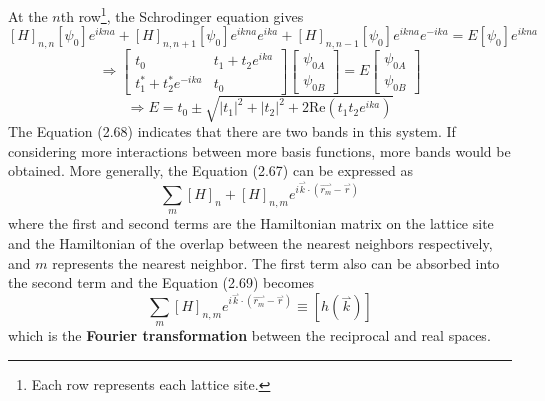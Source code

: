 At the $n$th row\footnote{Each row represents each lattice site.}, the Schrodinger equation gives \begin{equation}
    \left[H\right]_{n,n}\left[\psi_{0}\right]e^{ikna} + \left[H\right]_{n,n+1}\left[\psi_{0}\right]e^{ikna}e^{ika} + \left[H\right]_{n,n-1}\left[\psi_{0}\right]e^{ikna}e^{-ika} = E\left[\psi_{0}\right]e^{ikna}
\end{equation} \begin{equation}
    \Rightarrow \left[\begin{matrix}
    t_{0} & t_{1}+t_{2}e^{ika} \\
    t_{1}^{*}+t_{2}^{*}e^{-ika} & t_{0}
    \end{matrix}
    \right] \left[\begin{matrix}
    \psi_{0A} \\
    \psi_{0B}
    \end{matrix}
    \right] = E\left[\begin{matrix}
    \psi_{0A} \\
    \psi_{0B}
    \end{matrix}
    \right]\nonumber
\end{equation} \begin{equation}
    \Rightarrow E = t_{0} \pm \sqrt{\big|t_{1}\big|^{2}+\big|t_{2}\big|^{2}+2\text{Re}\left(t_{1}t_{2}e^{ika}\right)}
\end{equation} The Equation (2.68) indicates that there are two bands in this system. If considering more interactions between more basis functions, more bands would be obtained. More generally, the Equation (2.67) can be expressed as \begin{equation}
    \sum_{m}{\left[H\right]_{n} + \left[H\right]_{n,m}e^{i\overset{\rightharpoonup}{k}\cdot\left(\overset{\rightharpoonup}{r_{m}}-\overset{\rightharpoonup}{r}\right)}}
\end{equation} where the first and second terms are the Hamiltonian matrix on the lattice site and the Hamiltonian of the overlap between the nearest neighbors respectively, and $m$ represents the nearest neighbor. The first term also can be absorbed into the second term and the Equation (2.69) becomes \begin{equation}
    \boxed{
    \sum_{m}{\left[H\right]_{n,m}e^{i\overset{\rightharpoonup}{k}\cdot\left(\overset{\rightharpoonup}{r_{m}}-\overset{\rightharpoonup}{r}\right)}} \equiv \left[h(\overset{\rightharpoonup}{k})\right]
    }
\end{equation} which is the {\bf Fourier transformation} between the reciprocal and real spaces.
